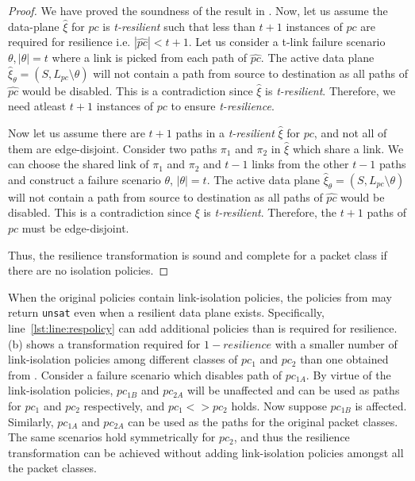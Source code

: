\iffull
	\begin{proof}
		We have proved the soundness of the result in . 
		Now, let us assume the data-plane $\hat{\xi}$ for $pc$ is \emph{t-resilient} such 
		that less than $t+1$ instances of $pc$ are required for resilience i.e. 
		$|\hat{pc}| < t+1$. Let us consider a 
		t-link failure scenario $\theta, |\theta| = t$ where a link is picked from
		each path of $\hat{pc}$. The active data plane
		$\hat{\xi}_\theta = (S, L_{pc} \setminus \theta)$ will not contain a
		path from source to destination as all paths of $\hat{pc}$ would be disabled.  
		This is a contradiction since $\hat{\xi}$ is \emph{t-resilient}. 
		Therefore, we need atleast $t+1$ instances of $pc$ to ensure \emph{t-resilience}.
		
		Now let us assume there are $t+1$ paths in a \emph{t-resilient} $\hat{\xi}$ for $pc$,
		and not all of them are edge-disjoint. Consider two paths $\pi_1$ and $\pi_2$
		in $\hat{\xi}$ which share a link. We can choose the shared link 
		of $\pi_1$ and $\pi_2$ and $t-1$ links from the other $t-1$ paths 
		and construct a failure scenario $\theta$, $|\theta| = t$.
		The active data plane
		$\hat{\xi}_\theta = (S, L_{pc} \setminus \theta)$ will not contain a
		path from source to destination as all paths of $\hat{pc}$ would be disabled.  
		This is a contradiction since $\xi$ is \emph{t-resilient}. Therefore,
		the $t+1$ paths of $pc$ must be edge-disjoint. 
		
		\noindent Thus, the resilience transformation is sound and complete for a  
		packet class if there are no isolation policies.
	\end{proof}
\fi

When the original policies contain link-isolation policies, the policies
from  may return \texttt{unsat} even when a
resilient data plane exists. Specifically, line~\ref{lst:line:respolicy}
can add additional policies than is required for resilience.
 (b) shows a transformation required for $1-resilience$ 
 with a smaller number of link-isolation policies among different classes
 of $pc_1$ and $pc_2$ than one obtained from . 
 Consider a failure scenario which disables path
 of $pc_{1A}$. By virtue of the link-isolation policies, $pc_{1B}$ and
 $pc_{2A}$ will be unaffected and can be used as paths for $pc_1$ 
 and $pc_2$ respectively, and $pc_1 <> pc_2$ holds. Now suppose
 $pc_{1B}$ is affected. Similarly, $pc_{1A}$ and $pc_{2A}$ can be used as
 the paths for the original packet classes. The same scenarios hold symmetrically
 for $pc_2$, and thus the resilience transformation can be achieved without
 adding link-isolation policies amongst all the packet classes. 
 
